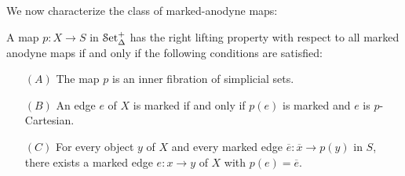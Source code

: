 We now characterize the class of marked-anodyne maps:

\begin{proposition}\label{dubudu}
A map $p: X \rightarrow S$ in $\operatorname{\mathcal{S}et_{\Delta}^{+}}$ has the right lifting property with respect to all marked anodyne maps if and only if the following conditions are satisfied:
\begin{itemize}
\item[$(A)$] The map $p$ is an inner fibration of simplicial sets.
\item[$(B)$] An edge $e$ of $X$ is marked if and only if $p(e)$ is marked and $e$ is $p$-Cartesian.
\item[$(C)$] For every object $y$ of $X$ and every marked edge $\overline{e}: \overline{x} \rightarrow p(y)$ in $S$, there exists a marked edge $e: x \rightarrow y$ of $X$ with $p(e) = \overline{e}$. 
\end{itemize}
\end{proposition}

